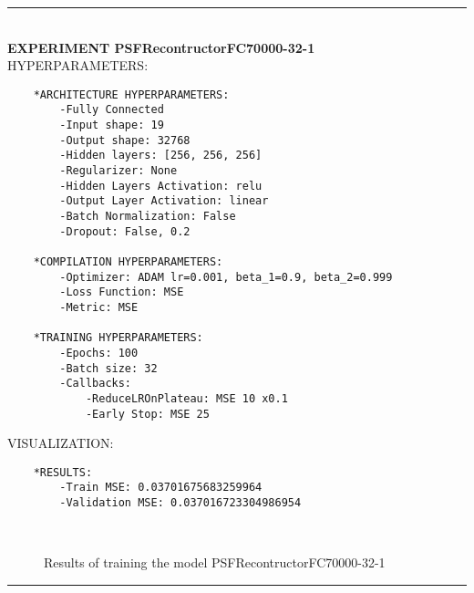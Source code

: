 \rule{0.5\textwidth}{0.5pt}\\

	{\large \textbf{EXPERIMENT PSFRecontructorFC70000-32-1}}\\
	
	{\normalsize HYPERPARAMETERS:}
	\begin{lstlisting}
	*ARCHITECTURE HYPERPARAMETERS:
		-Fully Connected
		-Input shape: 19
		-Output shape: 32768
		-Hidden layers: [256, 256, 256]
		-Regularizer: None
		-Hidden Layers Activation: relu
		-Output Layer Activation: linear
		-Batch Normalization: False
		-Dropout: False, 0.2
	
	*COMPILATION HYPERPARAMETERS:
		-Optimizer: ADAM lr=0.001, beta_1=0.9, beta_2=0.999
		-Loss Function: MSE
		-Metric: MSE
	
	*TRAINING HYPERPARAMETERS:
		-Epochs: 100
		-Batch size: 32
		-Callbacks: 
			-ReduceLROnPlateau: MSE 10 x0.1
			-Early Stop: MSE 25
	\end{lstlisting}
	
	{\normalsize VISUALIZATION:}
	\begin{lstlisting}
    *RESULTS:
        -Train MSE: 0.03701675683259964
        -Validation MSE: 0.037016723304986954
	\end{lstlisting}
	
	\begin{figure*}[ht!]
		\hspace{\fill}
		\hspace{\fill}	
		\\
		\caption{Results of training the model PSFRecontructorFC70000-32-1}
	\end{figure*}
	
\FloatBarrier	
\rule{0.5\textwidth}{0.5pt}\\